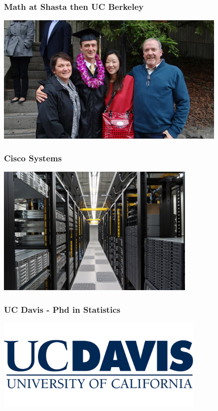 \documentclass{beamer}
\begin{document}
\begin{frame}


\frametitle{Math at Shasta then UC Berkeley }

\centerline{\includegraphics[height=2.5in]{figs/berkeley.jpg}}


\end{frame}
\begin{frame}


\frametitle{Cisco Systems}

\centerline{\includegraphics[height=2.5in]{figs/datacenter.jpg}}


\end{frame}
\begin{frame}


\frametitle{UC Davis - Phd in Statistics}

\centerline{\includegraphics[width=4in]{figs/davis.png}}


\end{frame}
\end{document}
